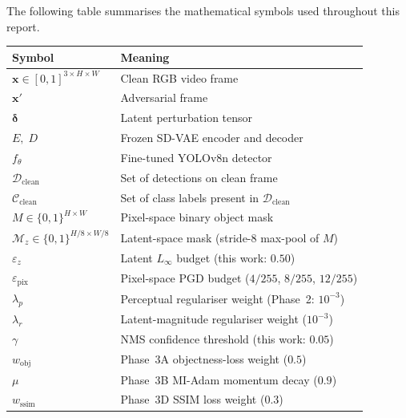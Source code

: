 \documentclass[12pt,a4paper]{report}
\begin{document}
The following table summarises the mathematical symbols used throughout
this report.

\begin{table}[h!]
  \centering
  \renewcommand{\arraystretch}{1.30}
  \begin{tabular}{@{}p{4.5cm}p{9.5cm}@{}}
    \toprule
    \textbf{Symbol} & \textbf{Meaning} \\
    \midrule
    $\mathbf{x} \in [0,1]^{3 \times H \times W}$ & Clean RGB video frame \\
    $\mathbf{x}'$                                  & Adversarial frame \\
    $\bm{\delta}$                                  & Latent perturbation tensor \\
    $E,\;D$                                        & Frozen SD-VAE encoder and decoder \\
    $f_\theta$                                     & Fine-tuned YOLOv8n detector \\
    $\mathcal{D}_\text{clean}$                     & Set of detections on clean frame \\
    $\mathcal{C}_\text{clean}$                     & Set of class labels present in $\mathcal{D}_\text{clean}$ \\
    $M \in \{0,1\}^{H \times W}$                   & Pixel-space binary object mask \\
    $\mathcal{M}_z \in \{0,1\}^{H/8 \times W/8}$  & Latent-space mask (stride-8 max-pool of $M$) \\
    $\varepsilon_z$                                & Latent $L_\infty$ budget (this work: $0.50$) \\
    $\varepsilon_\text{pix}$                       & Pixel-space PGD budget ($4/255$, $8/255$, $12/255$) \\
    $\lambda_p$                                    & Perceptual regulariser weight (Phase~2: $10^{-3}$) \\
    $\lambda_r$                                    & Latent-magnitude regulariser weight ($10^{-3}$) \\
    $\gamma$                                       & NMS confidence threshold (this work: $0.05$) \\
    $w_\text{obj}$                                 & Phase~3A objectness-loss weight ($0.5$) \\
    $\mu$                                          & Phase~3B MI-Adam momentum decay ($0.9$) \\
    $w_\text{ssim}$                                & Phase~3D SSIM loss weight ($0.3$) \\

\end{tabular}
\end{table}
\end{document}
